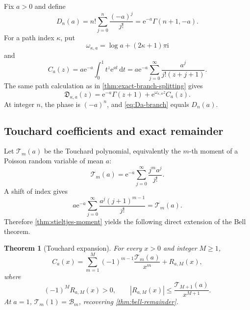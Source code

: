 \documentclass[11pt]{article}
\numberwithin{equation}{section}
\theoremstyle{mainthm}
\newtheorem{theorem}{Theorem}[section]
\theoremstyle{defstyle}
\theoremstyle{remark}
\newcommand{\e}{\mathrm e}
\newcommand{\ii}{\mathrm i}
\newcommand{\dd}{\,\mathrm d}
\newcommand{\Dsub}{\mathfrak D}
\newcommand{\Bell}{\mathcal B}
\newcommand{\Touch}{\mathcal T}
\newcommand{\abs}[1]{\left|#1\right|}
\begin{document}
Fix \(a>0\) and define
\begin{equation}\label{eq:Da-n}
 D_n(a)=n!\sum_{j=0}^{n}\frac{(-a)^j}{j!}
 =\e^{-a}\Gamma(n+1,-a).
\end{equation}
For a path index \(\kappa\), put
\begin{equation}\label{eq:omega-a}
 \omega_{\kappa,a}=\log a+(2\kappa+1)\pi\ii
\end{equation}
and
\begin{equation}\label{eq:Ca-def}
 C_a(z)=a\e^{-a}\int_0^1t^z\e^{at}\dd t
 =a\e^{-a}\sum_{j=0}^{\infty}\frac{a^j}{j!(z+j+1)}.
\end{equation}
The same path calculation as in \cref{thm:exact-branch-splitting} gives
\begin{equation}\label{eq:Da-branch}
 \boxed{
 \Dsub_{\kappa,a}(z)
 =\e^{-a}\Gamma(z+1)+\e^{\omega_{\kappa,a}z}C_a(z).}
\end{equation}
At integer \(n\), the phase is \((-a)^n\), and \cref{eq:Da-branch} equals \(D_n(a)\).

\subsection{Touchard coefficients and exact remainder}

Let \(\Touch_m(a)\) be the Touchard polynomial, equivalently the \(m\)-th moment of a Poisson random variable of mean \(a\):
\begin{equation}\label{eq:Touchard-def}
 \Touch_m(a)=\e^{-a}\sum_{j=0}^{\infty}\frac{j^m a^j}{j!}.
\end{equation}
A shift of index gives
\begin{equation}\label{eq:Touchard-shift-identity}
 a\e^{-a}\sum_{j=0}^{\infty}\frac{a^j(j+1)^{m-1}}{j!}
 =\Touch_m(a).
\end{equation}
Therefore \cref{thm:stieltjes-moment} yields the following direct extension of the Bell theorem.

\begin{theorem}[Touchard expansion]\label{thm:touchard-expansion}
For every \(x>0\) and integer \(M\ge1\),
\begin{equation}\label{eq:Ca-touchard}
 C_a(x)=\sum_{m=1}^{M}(-1)^{m-1}\frac{\Touch_m(a)}{x^m}
 +R_{a,M}(x),
\end{equation}
where
\begin{equation}\label{eq:Ca-touchard-bound}
 (-1)^MR_{a,M}(x)>0,
 \qquad
 \abs{R_{a,M}(x)}\le\frac{\Touch_{M+1}(a)}{x^{M+1}}.
\end{equation}
At \(a=1\), \(\Touch_m(1)=\Bell_m\), recovering \cref{thm:bell-remainder}.
\end{theorem}
\end{document}
